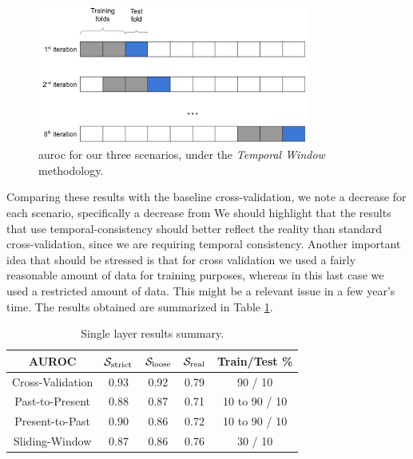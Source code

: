 \begin{figure}[!h]
	\centering
	\includegraphics[width=0.8\textwidth]{Figures/dia_slidingwindow.png}
	\caption[Single layer results for static features in \textit{Temporal Window}.]{\gls{auroc} for our three scenarios, under the \textit{Temporal Window} methodology.}
	\label{fig:slidingwindow3}
\end{figure}

Comparing these results with the baseline cross-validation, we note a decrease for each scenario, specifically a decrease from 
We should highlight that the results that use temporal-consistency should better reflect the reality than standard cross-validation, since we are requiring temporal consistency.
Another important idea that should be stressed is that for cross validation we used a fairly reasonable amount of data for training purposes, whereas in this last case we used a restricted amount of data. This might be a relevant issue in a few year's time. The results obtained are summarized in Table \ref{tab:multilayer_results}.

\begin{table}[!htb]
	\renewcommand{\arraystretch}{1.2} %
	\centering
	\begin{tabular}{ccccc}
		\hline AUROC & $\mathcal{S}_{\mathrm{strict}}$ & $\mathcal{S}_{\mathrm{loose}}$ & $\mathcal{S}_{\mathrm{real}}$ & Train/Test \%\\
		\hline Cross-Validation & 0.93 & 0.92 & 0.79 & 90 / 10\\
		\hline Past-to-Present & 0.88 & 0.87 & 0.71 & 10 to 90 / 10\\
		\hline Present-to-Past & 0.90 & 0.86 & 0.72 & 10 to 90 / 10\\
		\hline Sliding-Window & 0.87 & 0.86 & 0.76 & 30 / 10\\
		\hline
	\end{tabular}
	\caption{Single layer results summary.}
	\label{tab:multilayer_results}
\end{table}
